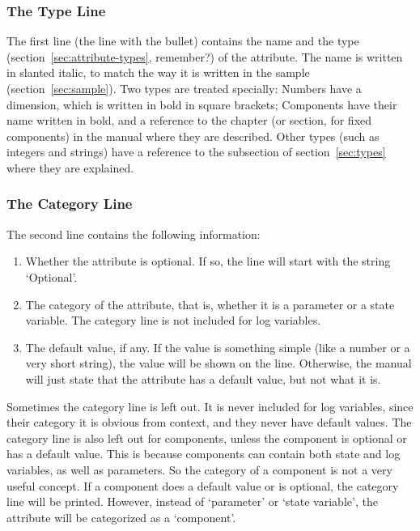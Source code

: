 \subsubsection{The Type Line}

The first line (the line with the bullet) contains the name and the
type (section~\ref{sec:attribute-types}, remember?) of the attribute.
The name is written in slanted italic, to match the way it is written
in the sample (section~\ref{sec:sample}).  Two types are treated
specially: Numbers have a dimension, which is written in bold in
square brackets; Components have their name written in bold, and a
reference to the chapter (or section, for fixed components) in the
manual where they are described.  Other types (such as integers and
strings) have a reference to the subsection of section~\ref{sec:types}
where they are explained.

\subsubsection{The Category Line}

The second line contains the following information:
\begin{enumerate}
\item Whether the attribute is optional.  If so, the line will start
  with the string `Optional'.
\item The category of the attribute, that is, whether it is a
  parameter or a state variable.  The category line is not included
  for log variables.
\item The default value, if any.  If the value is something simple
  (like a number or a very short string), the value will be shown on
  the line.  Otherwise, the manual will just state that the attribute
  has a default value, but not what it is.
\end{enumerate}

Sometimes the category line is left out.  It is never included for log
variables, since their category it is obvious from context, and they
never have default values.  The category line is also left out for
components, unless the component is optional or has a default value.
This is because components can contain both state and log variables, as
well as parameters. So the category of a component is not a very
useful concept.  If a component does a default value or is optional,
the category line will be printed.  However, instead of `parameter' or
`state variable', the attribute will be categorized as a `component'.

